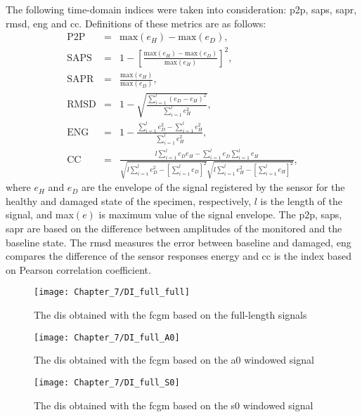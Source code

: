 The following time-domain indices were taken into consideration: \ac{p2p}, \ac{saps}, \ac{sapr}, \acf{rmsd}, \ac{eng} and \ac{cc}.
Definitions of these metrics are as follows:
\begin{eqnarray}
	\mathrm{P2P} & = & \mathrm{max}(e_H) - \mathrm{max}(e_D),\\
	\mathrm{SAPS} & = & 1 - \left[\frac{\mathrm{max}(e_H)-\mathrm{max}(e_D)}{\mathrm{max}(e_H)}\right]^2,\\
	\mathrm{SAPR} & = & \frac{\mathrm{max}(e_H)}{\mathrm{max}(e_D)},\\
	\mathrm{RMSD} & = & 1 - \sqrt{\frac{\sum_{i=1}^{l}\left(e_D-e_H\right)^2}	{\sum_{i=1}^{l}e_H^2}},\\
	\mathrm{ENG} & = & 1 -  \frac{\sum_{i=1}^{l}{e_D^2}-\sum_{i=1}^{l}{e_H^2}}{\sum_{i=1}^{l}{e_H^2}},\\
	\mathrm{CC} & = & \frac{l\sum_{i=1}^{l}e_De_H-\sum_{i=1}^{l}e_D\sum_{i=1}^{l}e_H}{\sqrt{l\sum_{i=1}^{l}e_D^2-\left[\sum_{i=1}^{l}e_D\right]^2}\sqrt{l\sum_{i=1}^{l}e_H^2-\left[\sum_{i=1}^{l}e_H\right]^2}},
\end{eqnarray}
where \(e_H\) and \(e_D\) are the envelope of the signal registered by the sensor for the healthy and damaged state of the specimen, respectively, \(l\) is the length of the signal, and max\((e)\) is maximum value of the signal envelope.
The \ac{p2p}, \ac{saps}, \ac{sapr} are based on the difference between amplitudes of the monitored and the baseline state.
The \ac{rmsd} measures the error between baseline and damaged, \ac{eng} compares the difference of the sensor responses energy and \ac{cc} is the index based on Pearson correlation coefficient.

\begin{figure}[!tbh]
	\begin{center}
		\texttt{[image: Chapter\_7/DI\_full\_full]}
	\end{center}
	\caption{The \aclp{di} obtained with the \acl{fcgm} based on the full-length signals}
	\label{fig:DI_full_full}
\end{figure}
\begin{figure}[!tbh]
	\begin{center}
		\texttt{[image: Chapter\_7/DI\_full\_A0]}
	\end{center}
	\caption{The \aclp{di} obtained with the \acl{fcgm} based on the \acs{a0} windowed signal}
	\label{fig:DI_full_A0}
\end{figure}
\begin{figure}[!tbh]
	\begin{center}
		\texttt{[image: Chapter\_7/DI\_full\_S0]}
	\end{center}
	\caption{The \aclp{di} obtained with the \acl{fcgm} based on the \acs{s0} windowed signal}
	\label{fig:DI_full_S0}
\end{figure}

